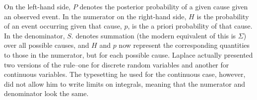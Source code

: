 \documentclass[a4paper,11pt]{apa7}
\begin{document}
On the left-hand side, $P$ denotes the posterior probability of a given cause given an observed event. In the numerator on the right-hand side, $H$ is the probability of an event occurring given that cause, $p$, is the a priori probability of that cause. In the denominator, $S.$ denotes summation (the modern equivalent of this is $\Sigma$) over all possible causes, and $H$ and $p$ now represent the corresponding quantities to those in the numerator, but for each possible cause. Laplace actually presented two versions of the rule--one for discrete random variables and another for continuous variables. The typesetting he used for the continuous case, however, did not allow him to write limits on integrals, meaning that the numerator and denominator look the same.
\end{document}
